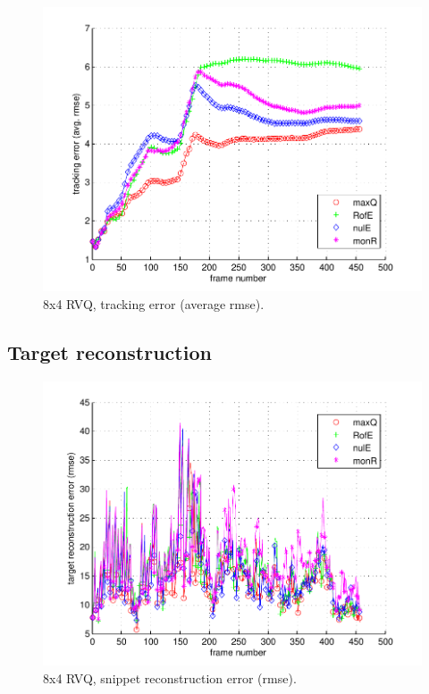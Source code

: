 								\begin{figure}[h!]
								\centering
								\includegraphics[height=0.38\textheight]{thesis/2_davidin300_8_4_1000_trk_armse.pdf}
								\caption{8x4 RVQ, tracking error (average rmse).}
								\label{fig:2_davidin300_8_4_1000_trk_avg_rmse}
								\end{figure}

\clearpage
\newpage
\subsection{Target reconstruction}

								\begin{figure}[h!]
								\centering
								\includegraphics[height=0.4\textheight]{thesis/2_davidin300_8_4_1000_snp_rmse.pdf}
								\caption{8x4 RVQ, snippet reconstruction error (rmse).}
								\label{fig:2_davidin300_8_4_1000_snp_rmse}
								\end{figure}


